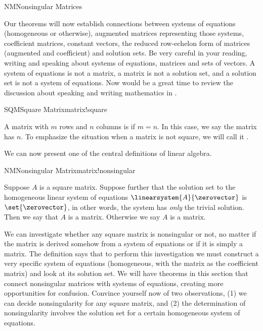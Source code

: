 \begin{subsect}{NM}{Nonsingular Matrices}
%
\begin{para}Our theorems will now establish connections between systems of equations (homogeneous or otherwise), augmented matrices representing those systems, coefficient matrices, constant vectors, the reduced row-echelon form of matrices (augmented and coefficient) and solution sets.  Be very careful in your reading, writing and speaking about systems of equations, matrices and sets of vectors.  A system of equations is not a matrix, a matrix is not a solution set, and a solution set is not a system of equations.  Now would be a great time to review the discussion about speaking and writing mathematics in .\end{para}
%
\begin{definition}{SQM}{Square Matrix}{matrix!square}
\begin{para}A matrix with $m$ rows and $n$ columns is  if $m=n$.  In this case, we say the matrix has  $n$.  To emphasize the situation when a matrix is not square, we will call it .\end{para}
\end{definition}
%
\begin{para}We can now present one of the central definitions of linear algebra.\end{para}
%
\begin{definition}{NM}{Nonsingular Matrix}{matrix!nonsingular}
\begin{para}Suppose $A$ is a square matrix.  Suppose further that the solution set to the homogeneous linear system of equations $\linearsystem{A}{\zerovector}$ is $\set{\zerovector}$, in other words, the system has {\em only} the trivial solution.  Then we say that $A$ is a  matrix.  Otherwise we say $A$ is a  matrix.\end{para}
\end{definition}
%
\begin{para}We can investigate whether any square matrix is nonsingular or not, no matter if the matrix is derived somehow from a system of equations or if it is simply a matrix.  The definition says that to perform this investigation we must construct a very specific system of equations (homogeneous, with the matrix as the coefficient matrix) and look at its solution set.  We will have theorems in this section that connect nonsingular matrices with systems of equations, creating more opportunities for confusion.  Convince yourself now of two observations, (1) we can decide nonsingularity for any square matrix, and (2) the determination of nonsingularity involves the solution set for a certain homogeneous system of equations.\end{para}

\end{subsect}

